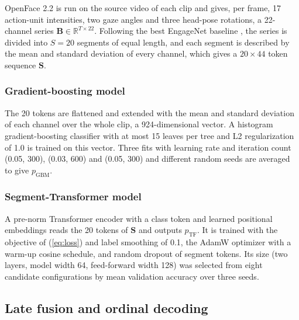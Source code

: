 \documentclass[pdflatex,iicol,sn-basic]{sn-jnl}
\begin{document}
OpenFace 2.2 \citep{baltrusaitis2018openface} is run on the source video of each clip and gives, per frame, 17 action-unit intensities, two gaze angles and three head-pose rotations, a 22-channel series $\mathbf{B} \in \mathbb{R}^{T \times 22}$. Following the best EngageNet baseline \citep{singh2023engagenet}, the series is divided into $S = 20$ segments of equal length, and each segment is described by the mean and standard deviation of every channel, which gives a $20 \times 44$ token sequence $\mathbf{S}$.

\subsubsection{Gradient-boosting model}\label{sec:gbm}

The 20 tokens are flattened and extended with the mean and standard deviation of each channel over the whole clip, a 924-dimensional vector. A histogram gradient-boosting classifier \citep{pedregosa2011sklearn} with at most 15 leaves per tree and L2 regularization of 1.0 is trained on this vector. Three fits with learning rate and iteration count (0.05, 300), (0.03, 600) and (0.05, 300) and different random seeds are averaged to give $p_{\mathrm{GBM}}$.

\subsubsection{Segment-Transformer model}\label{sec:segtf}

A pre-norm Transformer encoder \citep{vaswani2017attention} with a class token and learned positional embeddings reads the 20 tokens of $\mathbf{S}$ and outputs $p_{\mathrm{TF}}$. It is trained with the objective of (\ref{eq:loss}) and label smoothing of 0.1, the AdamW optimizer with a warm-up cosine schedule, and random dropout of segment tokens. Its size (two layers, model width 64, feed-forward width 128) was selected from eight candidate configurations by mean validation accuracy over three seeds.

\subsection{Late fusion and ordinal decoding}\label{sec:method_fusion}
\end{document}
